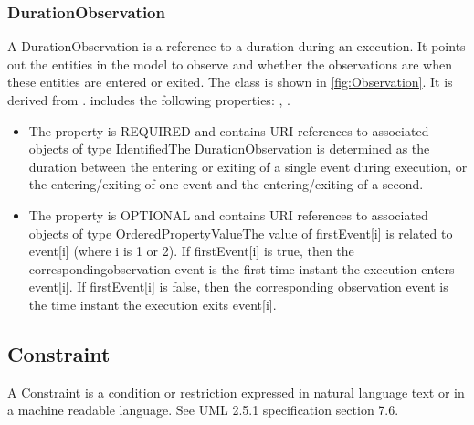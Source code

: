 \subsubsection{DurationObservation}%
\label{sec:uml:DurationObservation}%
A DurationObservation is a reference to a duration during an execution. It points out the entities in the model to observe and whether the observations are when these entities are entered or exited.%
\linebreak%
\linebreak%
The  class is shown in \ref{fig:Observation}. It is derived from .%
 includes the following properties: , . %
\begin{itemize}%
\item%
The  property is REQUIRED and contains URI references to associated objects of type IdentifiedThe DurationObservation is determined as the duration between the entering or exiting of a single event during execution, or the entering/exiting of one event and the entering/exiting of a second.%
\item%
The  property is OPTIONAL and contains URI references to associated objects of type OrderedPropertyValueThe value of firstEvent[i] is related to event[i] (where i is 1 or 2). If firstEvent[i] is true, then the correspondingobservation event is the first time instant the execution enters event[i]. If firstEvent[i] is false, then the corresponding observation event is the time instant the execution exits event[i].%
\end{itemize}%
\subsection{Constraint}%
\label{sec:uml:Constraint}%
A Constraint is a condition or restriction expressed in natural language text or in a machine readable language. See UML 2.5.1 specification section 7.6.%
\linebreak%
\linebreak%


